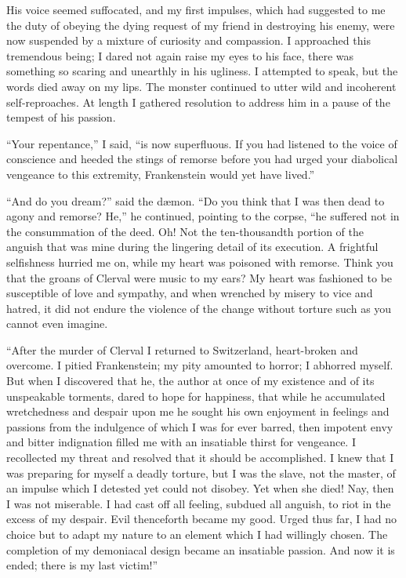 \documentclass[12pt,openright]{book}
\begin{document}
His voice seemed suffocated, and my first impulses, which had suggested to me the duty of obeying the dying request of my friend in destroying his enemy, were now suspended by a mixture of curiosity and compassion. I approached this tremendous being; I dared not again raise my eyes to his face, there was something so scaring and unearthly in his ugliness. I attempted to speak, but the words died away on my lips. The monster continued to utter wild and incoherent self-reproaches. At length I gathered resolution to address him in a pause of the tempest of his passion.

“Your repentance,” I said, “is now superfluous. If you had listened to the voice of conscience and heeded the stings of remorse before you had urged your diabolical vengeance to this extremity, Frankenstein would yet have lived.”

“And do you dream?” said the dæmon. “Do you think that I was then dead to agony and remorse? He,” he continued, pointing to the corpse, “he suffered not in the consummation of the deed. Oh! Not the ten-thousandth portion of the anguish that was mine during the lingering detail of its execution. A frightful selfishness hurried me on, while my heart was poisoned with remorse. Think you that the groans of Clerval were music to my ears? My heart was fashioned to be susceptible of love and sympathy, and when wrenched by misery to vice and hatred, it did not endure the violence of the change without torture such as you cannot even imagine.

“After the murder of Clerval I returned to Switzerland, heart-broken and overcome. I pitied Frankenstein; my pity amounted to horror; I abhorred myself. But when I discovered that he, the author at once of my existence and of its unspeakable torments, dared to hope for happiness, that while he accumulated wretchedness and despair upon me he sought his own enjoyment in feelings and passions from the indulgence of which I was for ever barred, then impotent envy and bitter indignation filled me with an insatiable thirst for vengeance. I recollected my threat and resolved that it should be accomplished. I knew that I was preparing for myself a deadly torture, but I was the slave, not the master, of an impulse which I detested yet could not disobey. Yet when she died! Nay, then I was not miserable. I had cast off all feeling, subdued all anguish, to riot in the excess of my despair. Evil thenceforth became my good. Urged thus far, I had no choice but to adapt my nature to an element which I had willingly chosen. The completion of my demoniacal design became an insatiable passion. And now it is ended; there is my last victim!”
\end{document}
